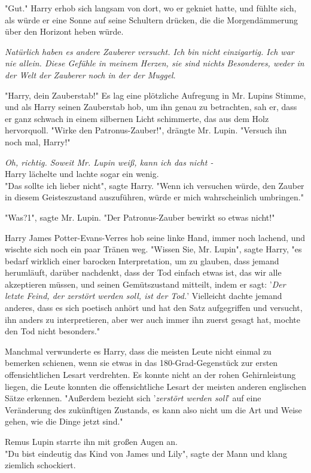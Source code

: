{"Gut." Harry erhob sich langsam von dort, wo er gekniet hatte, und fühlte sich, als würde er eine Sonne auf seine Schultern drücken, die die Morgendämmerung über den Horizont heben würde.

\emph{Natürlich haben es andere Zauberer versucht. Ich bin nicht einzigartig. Ich war nie allein. Diese Gefühle in meinem Herzen, sie sind nichts Besonderes, weder in der Welt der Zauberer noch in der der Muggel}.

"Harry, dein Zauberstab!" Es lag eine plötzliche Aufregung in Mr. Lupins Stimme, und als Harry seinen Zauberstab hob, um ihn genau zu betrachten, sah er, dass er ganz schwach in einem silbernen Licht schimmerte, das aus dem Holz hervorquoll. "Wirke den Patronus-Zauber!", drängte Mr. Lupin. "Versuch ihn noch mal, Harry!"

\emph{Oh, richtig. Soweit Mr. Lupin weiß, kann ich das nicht -}\\ Harry lächelte und lachte sogar ein wenig.\\ "Das sollte ich lieber nicht", sagte Harry. "Wenn ich versuchen würde, den Zauber in diesem Geisteszustand auszuführen, würde er mich wahrscheinlich umbringen."

"Was?1", sagte Mr. Lupin. "Der Patronus-Zauber bewirkt so etwas nicht!"

Harry James Potter-Evans-Verres hob seine linke Hand, immer noch lachend, und wischte sich noch ein paar Tränen weg. "Wissen Sie, Mr. Lupin", sagte Harry, "es bedarf wirklich einer barocken Interpretation, um zu glauben, dass jemand herumläuft, darüber nachdenkt, dass der Tod einfach etwas ist, das wir alle akzeptieren müssen, und seinen Gemütszustand mitteilt, indem er sagt: '\emph{Der letzte Feind, der zerstört werden soll, ist der Tod.}' Vielleicht dachte jemand anderes, dass es sich poetisch anhört und hat den Satz aufgegriffen und versucht, ihn anders zu interpretieren, aber wer auch immer ihn zuerst gesagt hat, mochte den Tod nicht besonders."

Manchmal verwunderte es Harry, dass die meisten Leute nicht einmal zu bemerken schienen, wenn sie etwas in das 180-Grad-Gegenstück zur ersten offensichtlichen Lesart verdrehten. Es konnte nicht an der rohen Gehirnleistung liegen, die Leute konnten die offensichtliche Lesart der meisten anderen englischen Sätze erkennen. "Außerdem bezieht sich '\emph{zerstört werden soll}' auf eine Veränderung des zukünftigen Zustands, es kann also nicht um die Art und Weise gehen, wie die Dinge jetzt sind."

Remus Lupin starrte ihn mit großen Augen an.\\ "Du bist eindeutig das Kind von James und Lily", sagte der Mann und klang ziemlich schockiert.

}
